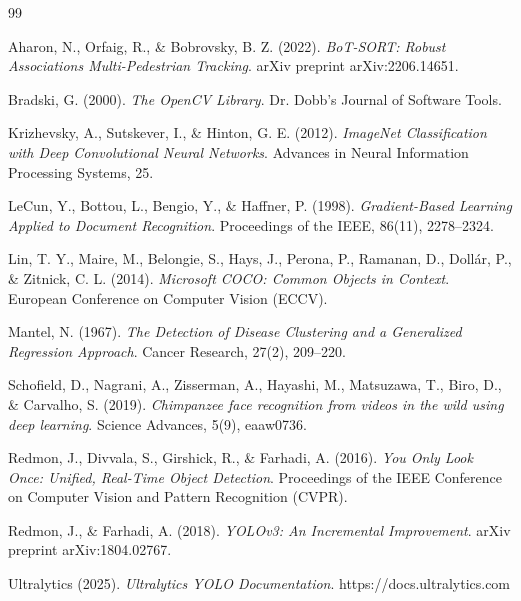 \documentclass[11pt,a4paper]{report}
\begin{document}
\begin{thebibliography}{99}

Aharon, N., Orfaig, R., \& Bobrovsky, B. Z. (2022).
\newblock \textit{BoT-SORT: Robust Associations Multi-Pedestrian Tracking}.
\newblock arXiv preprint arXiv:2206.14651.

Bradski, G. (2000).
\newblock \textit{The OpenCV Library}.
\newblock Dr. Dobb's Journal of Software Tools.

Krizhevsky, A., Sutskever, I., \& Hinton, G. E. (2012).
\newblock \textit{ImageNet Classification with Deep Convolutional Neural Networks}.
\newblock Advances in Neural Information Processing Systems, 25.

LeCun, Y., Bottou, L., Bengio, Y., \& Haffner, P. (1998).
\newblock \textit{Gradient-Based Learning Applied to Document Recognition}.
\newblock Proceedings of the IEEE, 86(11), 2278--2324.

Lin, T. Y., Maire, M., Belongie, S., Hays, J., Perona, P.,
Ramanan, D., Dollár, P., \& Zitnick, C. L. (2014).
\newblock \textit{Microsoft COCO: Common Objects in Context}.
\newblock European Conference on Computer Vision (ECCV).

Mantel, N. (1967).
\newblock \textit{The Detection of Disease Clustering and a Generalized Regression Approach}.
\newblock Cancer Research, 27(2), 209--220.

Schofield, D., Nagrani, A., Zisserman, A., Hayashi, M., Matsuzawa, T., Biro, D., \& Carvalho, S. (2019).
\newblock \textit{Chimpanzee face recognition from videos in the wild using deep learning}.
\newblock Science Advances, 5(9), eaaw0736.

Redmon, J., Divvala, S., Girshick, R., \& Farhadi, A. (2016).
\newblock \textit{You Only Look Once: Unified, Real-Time Object Detection}.
\newblock Proceedings of the IEEE Conference on Computer Vision and Pattern Recognition (CVPR).

Redmon, J., \& Farhadi, A. (2018).
\newblock \textit{YOLOv3: An Incremental Improvement}.
\newblock arXiv preprint arXiv:1804.02767.

Ultralytics (2025).
\newblock \textit{Ultralytics YOLO Documentation}.
\newblock https://docs.ultralytics.com

\end{thebibliography}
\end{document}

